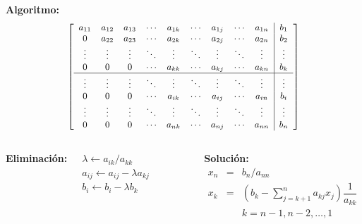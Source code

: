 \documentclass[9pt, aspectratio=169]{beamer}
\begin{document}
\begin{frame}
	\textbf{Algoritmo:}
	\begin{equation*} {\small
			\left[
				\begin{array}{ccccccccc|c}
					a_{11} & a_{12} & a_{13} & \cdots & a_{1k} & \cdots & a_{1j} & \cdots & a_{1n} & b_1    \\
					0      & a_{22} & a_{23} & \cdots & a_{2k} & \cdots & a_{2j} & \cdots & a_{2n} & b_2    \\
					\vdots & \vdots & \vdots & \ddots & \vdots & \ddots & \vdots & \ddots & \vdots & \vdots \\
					0      & 0      & 0      & \cdots & a_{kk} & \cdots & a_{kj} & \cdots & a_{kn} & b_k    \\
					\hline
					\vdots & \vdots & \vdots & \ddots & \vdots & \ddots & \vdots & \ddots & \vdots & \vdots \\
					0      & 0      & 0      & \cdots & a_{ik} & \cdots & a_{ij} & \cdots & a_{in} & b_i    \\
					\vdots & \vdots & \vdots & \ddots & \vdots & \ddots & \vdots & \ddots & \vdots & \vdots \\
					0      & 0      & 0      & \cdots & a_{nk} & \cdots & a_{nj} & \cdots & a_{nn} & b_n    \\
				\end{array} \right] }
	\end{equation*}
	\begin{columns}[t]
		\column{5cm}
		\textbf{Eliminación:} {\small
			\begin{algorithmic}[1]
				\State $\lambda \gets a_{ik}/a_{kk}$
				\State $a_{ij} \gets a_{ij} - \lambda a_{kj}$
				\EndFor
				\State $b_i \gets b_i - \lambda b_k$
				\EndFor
			\end{algorithmic} }
		\column{6cm}
		\textbf{Solución:} {\small
			\begin{eqnarray*}
				x_n &=& b_n / a_{nn} \\
				x_k &=& \left( b_k- \sum_{j=k+1}^n a_{kj}x_j \right)  \dfrac{1}{a_{kk}} \\
				& &k = n-1, n-2, \ldots, 1
			\end{eqnarray*} }
	\end{columns}
\end{frame}
\end{document}
